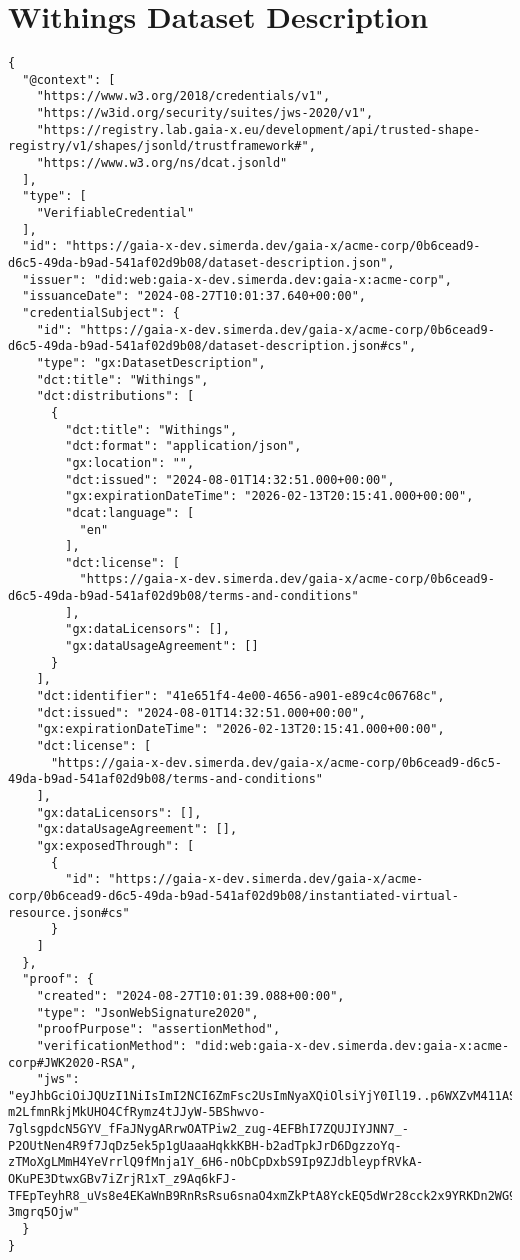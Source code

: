 \section{Withings Dataset Description}

\begin{verbatim}
{
  "@context": [
    "https://www.w3.org/2018/credentials/v1",
    "https://w3id.org/security/suites/jws-2020/v1",
    "https://registry.lab.gaia-x.eu/development/api/trusted-shape-registry/v1/shapes/jsonld/trustframework#",
    "https://www.w3.org/ns/dcat.jsonld"
  ],
  "type": [
    "VerifiableCredential"
  ],
  "id": "https://gaia-x-dev.simerda.dev/gaia-x/acme-corp/0b6cead9-d6c5-49da-b9ad-541af02d9b08/dataset-description.json",
  "issuer": "did:web:gaia-x-dev.simerda.dev:gaia-x:acme-corp",
  "issuanceDate": "2024-08-27T10:01:37.640+00:00",
  "credentialSubject": {
    "id": "https://gaia-x-dev.simerda.dev/gaia-x/acme-corp/0b6cead9-d6c5-49da-b9ad-541af02d9b08/dataset-description.json#cs",
    "type": "gx:DatasetDescription",
    "dct:title": "Withings",
    "dct:distributions": [
      {
        "dct:title": "Withings",
        "dct:format": "application/json",
        "gx:location": "",
        "dct:issued": "2024-08-01T14:32:51.000+00:00",
        "gx:expirationDateTime": "2026-02-13T20:15:41.000+00:00",
        "dcat:language": [
          "en"
        ],
        "dct:license": [
          "https://gaia-x-dev.simerda.dev/gaia-x/acme-corp/0b6cead9-d6c5-49da-b9ad-541af02d9b08/terms-and-conditions"
        ],
        "gx:dataLicensors": [],
        "gx:dataUsageAgreement": []
      }
    ],
    "dct:identifier": "41e651f4-4e00-4656-a901-e89c4c06768c",
    "dct:issued": "2024-08-01T14:32:51.000+00:00",
    "gx:expirationDateTime": "2026-02-13T20:15:41.000+00:00",
    "dct:license": [
      "https://gaia-x-dev.simerda.dev/gaia-x/acme-corp/0b6cead9-d6c5-49da-b9ad-541af02d9b08/terms-and-conditions"
    ],
    "gx:dataLicensors": [],
    "gx:dataUsageAgreement": [],
    "gx:exposedThrough": [
      {
        "id": "https://gaia-x-dev.simerda.dev/gaia-x/acme-corp/0b6cead9-d6c5-49da-b9ad-541af02d9b08/instantiated-virtual-resource.json#cs"
      }
    ]
  },
  "proof": {
    "created": "2024-08-27T10:01:39.088+00:00",
    "type": "JsonWebSignature2020",
    "proofPurpose": "assertionMethod",
    "verificationMethod": "did:web:gaia-x-dev.simerda.dev:gaia-x:acme-corp#JWK2020-RSA",
    "jws": "eyJhbGciOiJQUzI1NiIsImI2NCI6ZmFsc2UsImNyaXQiOlsiYjY0Il19..p6WXZvM411ASxFOBZvn-m2LfmnRkjMkUHO4CfRymz4tJJyW-5BShwvo-7glsgpdcN5GYV_fFaJNygARrwOATPiw2_zug-4EFBhI7ZQUJIYJNN7_-P2OUtNen4R9f7JqDz5ek5p1gUaaaHqkkKBH-b2adTpkJrD6DgzzoYq-zTMoXgLMmH4YeVrrlQ9fMnja1Y_6H6-nObCpDxbS9Ip9ZJdbleypfRVkA-OKuPE3DtwxGBv7iZrjR1xT_z9Aq6kFJ-TFEpTeyhR8_uVs8e4EKaWnB9RnRsRsu6snaO4xmZkPtA8YckEQ5dWr28cck2x9YRKDn2WG9BVz6-3mgrq5Ojw"
  }
}
\end{verbatim}

